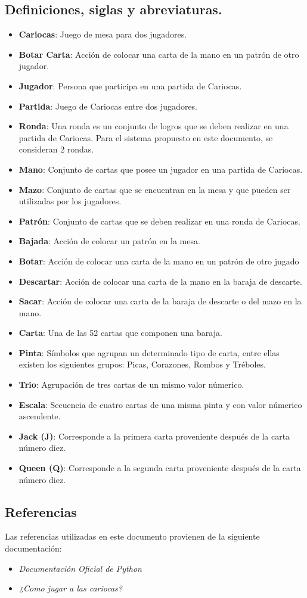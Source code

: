 \subsection{Definiciones, siglas y abreviaturas.}\label{cap:definiciones} 
\begin{itemize}
    \item \textbf{Cariocas}: Juego de mesa para dos jugadores.
    \item \textbf{Botar Carta}: Acción de colocar una carta de la mano en un patrón de otro jugador.
    \item \textbf{Jugador}: Persona que participa en una partida de Cariocas.
    \item \textbf{Partida}: Juego de Cariocas entre dos jugadores.
    \item \textbf{Ronda}: Una ronda es un conjunto de logros que se deben realizar en una partida de Cariocas. Para el sistema propuesto en este documento, se consideran 2 rondas.
    \item \textbf{Mano}: Conjunto de cartas que posee un jugador en una partida de Cariocas.
    \item \textbf{Mazo}: Conjunto de cartas que se encuentran en la mesa y que pueden ser utilizadas por los jugadores.
    \item \textbf{Patrón}: Conjunto de cartas que se deben realizar en una ronda de Cariocas.
    \item \textbf{Bajada}: Acción de colocar un patrón en la mesa.
    \item \textbf{Botar}: Acción de colocar una carta de la mano en un patrón de otro jugado
    \item \textbf{Descartar}: Acción de colocar una carta de la mano en la baraja de descarte.
    \item \textbf{Sacar}: Acción de colocar una carta de la baraja de descarte o del mazo en la mano.
    \item \textbf{Carta}: Una de las 52 cartas que componen una baraja.
    \item \textbf{Pinta}: Símbolos que agrupan un determinado tipo de carta, entre ellas existen los siguientes grupos: Picas, Corazones, Rombos y Tréboles.
    \item \textbf{Trio}: Agrupación de tres cartas de un mismo valor númerico.
    \item \textbf{Escala}: Secuencia de cuatro cartas de una misma pinta y con valor númerico ascendente.
    \item \textbf{Jack (J)}: Corresponde a la primera carta proveniente después de la carta número diez.
    \item \textbf{Queen (Q)}: Corresponde a la segunda carta proveniente después de la carta número diez.
\end{itemize} 

\subsection{Referencias}
Las referencias utilizadas en este documento provienen de la siguiente documentación:
\begin{itemize}
    \item \textit{Documentación Oficial de Python} \cite{python}
    \item \textit{¿Como jugar a las cariocas?} \cite{cariocas}
\end{itemize}